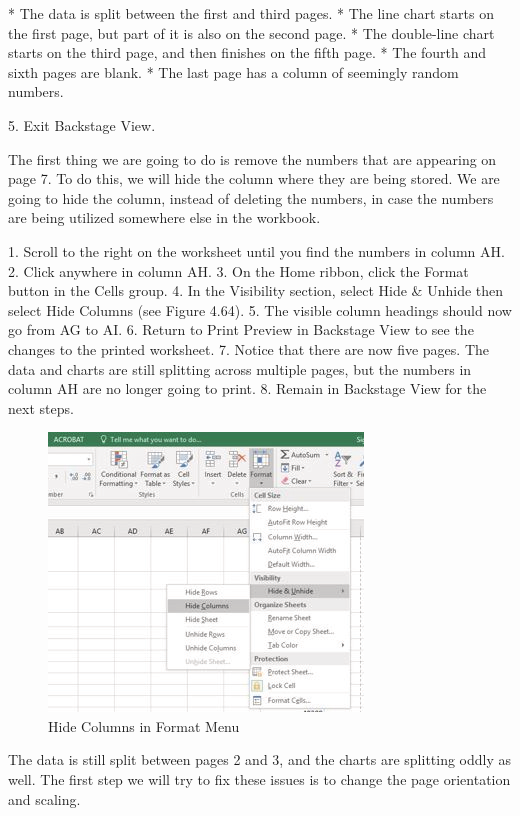 * The data is split between the first and third pages.
* The line chart starts on the first page, but part of it is also on the second page.
* The double-line chart starts on the third page, and then finishes on the fifth page.
* The fourth and sixth pages are blank.
* The last page has a column of seemingly random numbers.

5. Exit Backstage View.

The first thing we are going to do is remove the numbers that are appearing on page 7. To do this,
we will hide the column where they are being stored. We are going to hide the column, instead of
deleting the numbers, in case the numbers are being utilized somewhere else in the workbook.

1. Scroll to the right on the worksheet until you find the numbers in column AH.
2. Click anywhere in column AH.
3. On the Home ribbon, click the Format button in the Cells group.
4. In the Visibility section, select Hide \& Unhide then select Hide Columns (see Figure 4.64).
5. The visible column headings should now go from AG to AI.
6. Return to Print Preview in Backstage View to see the changes to the printed worksheet.
7. Notice that there are now five pages. The data and charts are still splitting across multiple
pages, but the numbers in column AH are no longer going to print.
8. Remain in Backstage View for the next steps.


\begin{figure}[H]
	\centering
	\includegraphics[width=\maxwidth{.95\linewidth}]{gfx/ch04_fig51}
	\caption{Hide Columns in Format Menu}
	\label{04:fig51}
\end{figure}

The data is still split between pages 2 and 3, and the charts are splitting oddly as well. The first step
we will try to fix these issues is to change the page orientation and scaling.

